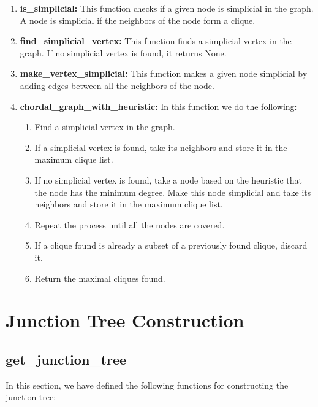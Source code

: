 \documentclass[12pt]{article}
\begin{document}
\begin{enumerate}
    \item \textbf{is\_simplicial:} This function checks if a given node is simplicial in the graph. A node is simplicial if the neighbors of the node form a clique.

    \item \textbf{find\_simplicial\_vertex:} This function finds a simplicial vertex in the graph. If no simplicial vertex is found, it returns None.

    \item \textbf{make\_vertex\_simplicial:} This function makes a given node simplicial by adding edges between all the neighbors of the node.

    \item \textbf{chordal\_graph\_with\_heuristic:} In this function we do the following:
        \begin{enumerate}
            \item Find a simplicial vertex in the graph.
            \item If a simplicial vertex is found, take its neighbors and store it in the maximum clique list.
            \item If no simplicial vertex is found, take a node based on the heuristic that the node has the minimum degree. Make this node simplicial and take its neighbors and store it in the maximum clique list.
            \item Repeat the process until all the nodes are covered.
            \item If a clique found is already a subset of a previously found clique, discard it.
            \item Return the maximal cliques found.
        \end{enumerate}

\end{enumerate}

\section{Junction Tree Construction}

\subsection{get\_junction\_tree}
In this section, we have defined the following functions for constructing the junction tree:
\end{document}
